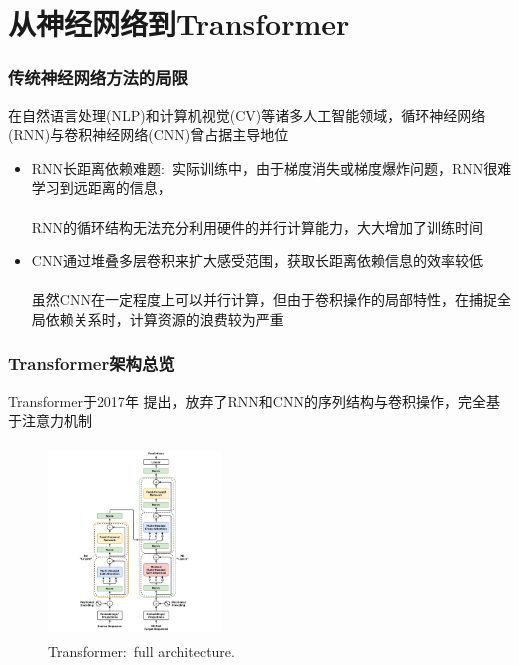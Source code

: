 \section{从神经网络到\rm{Transformer}}
\begin{frame}
	\frametitle{传统神经网络方法的局限}
    在自然语言处理\textrm{(NLP)}和计算机视觉\textrm{(CV)}等诸多人工智能领域，循环神经网络\textrm{(RNN)}与卷积神经网络\textrm{(CNN)}曾占据主导地位\\
    {\fontsize{7.2pt}{6.2pt}\selectfont{\textcolor{red}{随着数据规模的增长和任务复杂度的提升，传统神经网络在长距离依赖和并行计算方面的局限性逐渐凸显}}}
    \begin{itemize}
	    \item \textrm{RNN}长距离依赖难题:~实际训练中，由于梯度消失或梯度爆炸问题，\textrm{RNN}很难学习到远距离的信息，\\
		    {\fontsize{7.2pt}{6.2pt}\selectfont{\textcolor{red}{例如:~在文本翻译任务中，开头的单词信息很难传递到句子末尾}}}\\
		    \textrm{RNN}的循环结构无法充分利用硬件的并行计算能力，大大增加了训练时间
	    \item \textrm{CNN}通过堆叠多层卷积来扩大感受范围，获取长距离依赖信息的效率较低\\
		    {\fontsize{7.2pt}{6.2pt}\selectfont{\textcolor{red}{比如:~在处理长文本时，难以直接捕捉到相隔较远的文本片段之间的语义关联}}}\\
		    虽然\textrm{CNN}在一定程度上可以并行计算，但由于卷积操作的局部特性，在捕捉全局依赖关系时，计算资源的浪费较为严重
    \end{itemize}
\end{frame}


\begin{frame}
	\frametitle{\textrm{Transformer}架构总览}
	\textrm{Transformer}于\textrm{2017}年%
    提出，放弃了\textrm{RNN}和\textrm{CNN}的序列结构与卷积操作，完全基于注意力机制\\
    {\fontsize{7.2pt}{6.2pt}}
\begin{figure}[h!]
\centering
\includegraphics[height=2.0in, width=1.8in, viewport=300 0 1200 1500,clip]{Figures/Transformer_full_architecture.png}
\caption{\tiny \textrm{Transformer:~full architecture.}}%
\label{Transformer_full_architecture}
\end{figure}
\end{frame}

